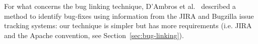 For what concerns the bug linking technique, D'Ambros et al.~\cite{d2012evaluating} described a method to identify bug-fixes using information from the JIRA and Bugzilla issue tracking systems: our technique is simpler but has more requirements (i.e. JIRA and the Apache convention, see Section~\ref{sec:bug-linking}).





